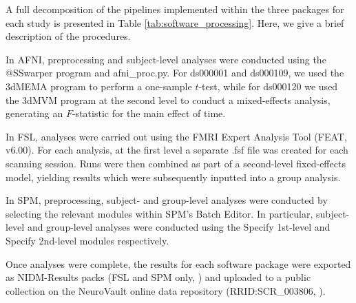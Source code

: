 A full decomposition of the pipelines implemented within the three packages for each study is presented in Table \ref{tab:software_processing}. Here, we give a brief description of the procedures. 

In AFNI, preprocessing and subject-level analyses were conducted using the @SSwarper program and afni\_proc.py. For ds000001 and ds000109, we used the 3dMEMA program to perform a one-sample $t$-test, while for ds000120 we used the 3dMVM program at the second level to conduct a mixed-effects analysis, generating an $F$-statistic for the main effect of time. 

In FSL, analyses were carried out using the FMRI Expert Analysis Tool (FEAT, v6.00). For each analysis, at the first level a separate .fsf file was created for each scanning session. Runs were then combined as part of a second-level fixed-effects model, yielding results which were subsequently inputted into a group analysis. 

In SPM, preprocessing, subject- and group-level analyses were conducted by selecting the relevant modules within SPM's Batch Editor. In particular, subject-level and group-level analyses were conducted using the Specify 1st-level and Specify 2nd-level modules respectively. 

Once analyses were complete, the results for each software package were exported as NIDM-Results packs (FSL and SPM only, \citep{Maumet2016-se}) and uploaded to a public collection on the NeuroVault online data repository (RRID:SCR\_003806, \citep{Gorgolewski2015-vs}). 

